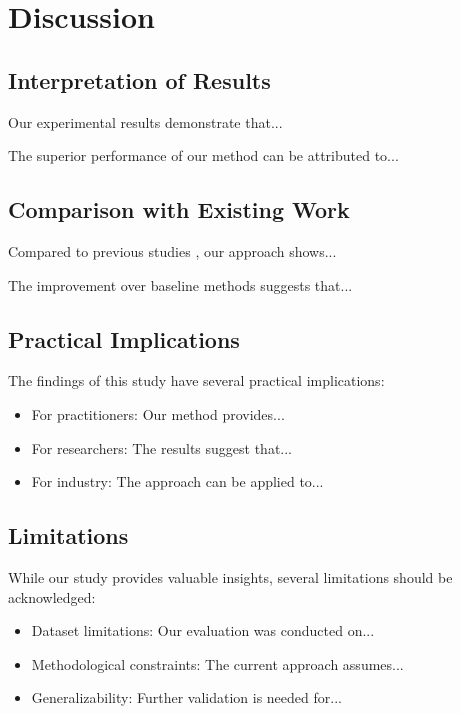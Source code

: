 \section{Discussion}
\label{sec:discussion}


\subsection{Interpretation of Results}

Our experimental results demonstrate that...

The superior performance of our method can be attributed to...

\subsection{Comparison with Existing Work}

Compared to previous studies \cite{ref1,ref2}, our approach shows...

The improvement over baseline methods suggests that...

\subsection{Practical Implications}

The findings of this study have several practical implications:

\begin{itemize}
    \item For practitioners: Our method provides...
    \item For researchers: The results suggest that...
    \item For industry: The approach can be applied to...
\end{itemize}

\subsection{Limitations}

While our study provides valuable insights, several limitations should be acknowledged:

\begin{itemize}
    \item Dataset limitations: Our evaluation was conducted on...
    \item Methodological constraints: The current approach assumes...
    \item Generalizability: Further validation is needed for...
\end{itemize}

